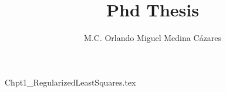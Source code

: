 \documentclass[letterpaper,11pt]{book}
\title{Phd Thesis}
\author{M.C. Orlando Miguel Medina C\'azares}
\begin{document}
\maketitle


\clearpage
\thispagestyle{empty}

\tableofcontents
{}
\listoffigures

\mainmatter
{Chpt1_RegularizedLeastSquares.tex}



\end{document}
